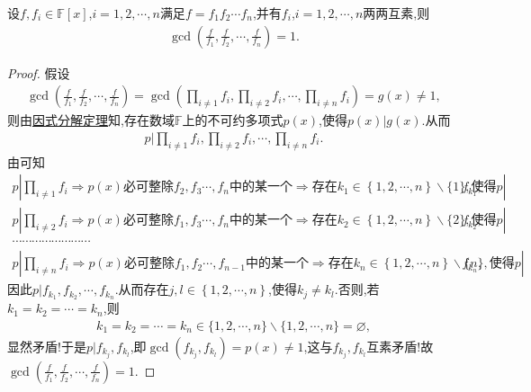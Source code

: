 \documentclass[../../main.tex]{subfiles}%
\begin{document}
\begin{proposition}\label{proposition:f除以两两互素多项式得到的多项式组互素}
设$f,f_i\in \mathbb{F}[x]$,$i=1,2,\cdots,n$满足$f=f_1f_2\cdots f_n$,并有$f_i$,$i=1,2,\cdots,n$两两互素,则
\begin{align*}
\gcd\left( \frac{f}{f_1},\frac{f}{f_2},\cdots ,\frac{f}{f_n} \right) =1.
\end{align*}
\end{proposition}
\begin{proof}
假设
\begin{align*}
\gcd\left( \frac{f}{f_1},\frac{f}{f_2},\cdots ,\frac{f}{f_n} \right) =\gcd\left( \prod_{i\ne 1}{f_i},\prod_{i\ne 2}{f_i},\cdots ,\prod_{i\ne n}{f_i} \right) =g(x)\ne 1,
\end{align*}
则由\hyperref[theorem:因式分解定理]{因式分解定理}知,存在数域$\mathbb{F}$上的不可约多项式$p(x)$,使得$p(x)|g(x)$.从而
\begin{align*}
p|\prod_{i\ne 1}{f_i},\prod_{i\ne 2}{f_i},\cdots ,\prod_{i\ne n}{f_i}.
\end{align*}
由可知
\begin{gather}
p|\prod_{i\ne 1}{f_i}\Longrightarrow p\left( x \right) \text{必可整除}f_2,f_3\cdots ,f_n\text{中的某一个}\Longrightarrow \text{存在}k_1\in \left\{ 1,2,\cdots ,n \right\}\backslash \{1\} ,\text{使得}p|f_{k_1},\nonumber 
\\
p|\prod_{i\ne 2}{f_i}\Longrightarrow p\left( x \right) \text{必可整除}f_1,f_3\cdots ,f_n\text{中的某一个}\Longrightarrow \text{存在}k_2\in \left\{ 1,2,\cdots ,n \right\}\backslash \{2\} ,\text{使得}p|f_{k_2},
\nonumber \\
\cdots \cdots \cdots \cdots \cdots \cdots \cdots \cdots 
\nonumber \\
p|\prod_{i\ne n}{f_i}\Longrightarrow p\left( x \right) \text{必可整除}f_1,f_2\cdots ,f_{n-1}\text{中的某一个}\Longrightarrow \text{存在}k_n\in \left\{ 1,2,\cdots ,n \right\}\backslash \{n\}  ,\text{使得}p|f_{k_n},\nonumber
\end{gather}
因此$p|f_{k_1},f_{k_2},\cdots,f_{k_n}$.从而存在$j,l\in \left\{ 1,2,\cdots,n \right\}$,使得$k_j\ne k_l$.否则,若$k_1=k_2=\cdots=k_n$,则\begin{align*}
k_1=k_2=\cdots=k_n\in \{1,2,\cdots,n\}\backslash \{1,2,\cdots,n\}=\varnothing,
\end{align*}
显然矛盾!于是$p|f_{k_j},f_{k_l}$,即$\gcd(f_{k_j},f_{k_l})=p(x)\ne 1$,这与$f_{k_j},f_{k_l}$互素矛盾!故$\gcd\left( \frac{f}{f_1},\frac{f}{f_2},\cdots ,\frac{f}{f_n} \right) =1$.
\end{proof}
\end{document}

